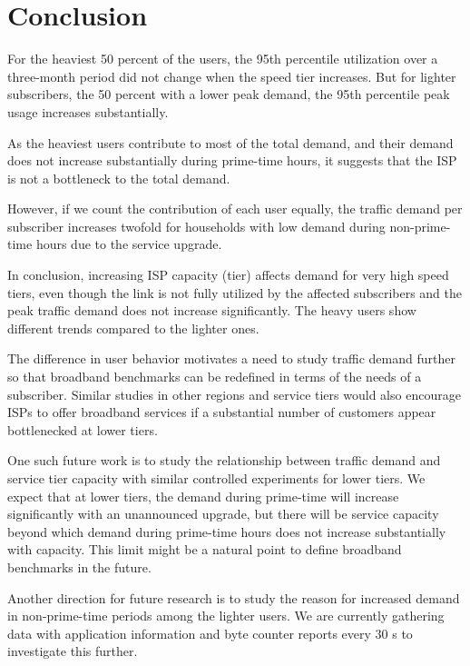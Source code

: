 \section{Conclusion}\label{sec:conclusion}


For the heaviest 50 percent of the users, the 95th percentile utilization over a 
three-month period did not change when the speed tier increases. But for lighter 
subscribers, the 50 percent with a lower peak demand, the 95th percentile peak 
usage increases substantially.

As the heaviest users contribute to most of the total demand, and their demand 
does not increase substantially during prime-time hours, it suggests that the 
ISP is not a bottleneck to the total demand.

However, if we count the contribution of each user equally, the traffic demand 
per subscriber increases twofold for households with low demand 
during non-prime-time hours due to the service upgrade.

In conclusion, increasing ISP capacity (tier) affects demand for very high 
speed tiers, even though the link is not fully utilized by the 
affected subscribers and the peak traffic demand does not increase 
significantly. The heavy users show different trends compared to the lighter 
ones.

The difference in user behavior motivates a need to study 
traffic demand further so that broadband benchmarks can be redefined in terms 
of the needs of a subscriber. Similar studies in other regions and service 
tiers would also encourage ISPs to offer broadband services if a substantial 
number of customers appear bottlenecked at lower tiers.

One such future work is to study the relationship between traffic demand 
and service tier capacity with similar controlled experiments for lower tiers. 
We expect that at lower tiers, the demand during prime-time will increase 
significantly with an unannounced upgrade, but there will be service capacity 
beyond which demand during prime-time hours does not increase substantially with
capacity. This limit might be a natural point to define broadband benchmarks in  
the future.

Another direction for future research is to study the reason for increased 
demand in non-prime-time periods among the lighter users. We are currently 
gathering data with application information and byte counter reports every 30 s 
to investigate this further.

